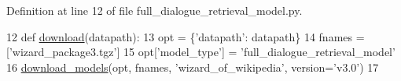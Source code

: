Definition at line 12 of file full\+\_\+dialogue\+\_\+retrieval\+\_\+model.\+py.


\begin{DoxyCode}
12 \textcolor{keyword}{def }\hyperlink{namespaceparlai_1_1zoo_1_1wizard__of__wikipedia_1_1full__dialogue__retrieval__model_ac0657f65992bc0ee1be1b6f673ae50e6}{download}(datapath):
13     opt = \{\textcolor{stringliteral}{'datapath'}: datapath\}
14     fnames = [\textcolor{stringliteral}{'wizard\_package3.tgz'}]
15     opt[\textcolor{stringliteral}{'model\_type'}] = \textcolor{stringliteral}{'full\_dialogue\_retrieval\_model'}
16     \hyperlink{namespaceparlai_1_1core_1_1build__data_ab697f23f05d3e36d7979fe5e0ed7911e}{download\_models}(opt, fnames, \textcolor{stringliteral}{'wizard\_of\_wikipedia'}, version=\textcolor{stringliteral}{'v3.0'})
17 \end{DoxyCode}
